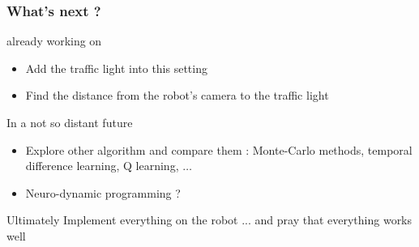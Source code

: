 \documentclass[dvipsnames,svgnames]{beamer}
\begin{document}
\begin{frame}
\frametitle{What's next ? }



\begin{block}{already working on}
\begin{itemize}
\item Add the traffic light into this setting
\item Find the distance from the robot's camera to the traffic light
\end{itemize}
\end{block}

\begin{block}{In a not so distant future}
\begin{itemize}
\item Explore other algorithm and compare them : Monte-Carlo methods, temporal difference learning, Q learning, $\ldots$
\item Neuro-dynamic programming ?
\end{itemize}
\end{block}

\pause
\begin{block}{Ultimately}
Implement everything on the robot ... \pause and pray that everything works well
\end{block}

\end{frame}
\end{document}
